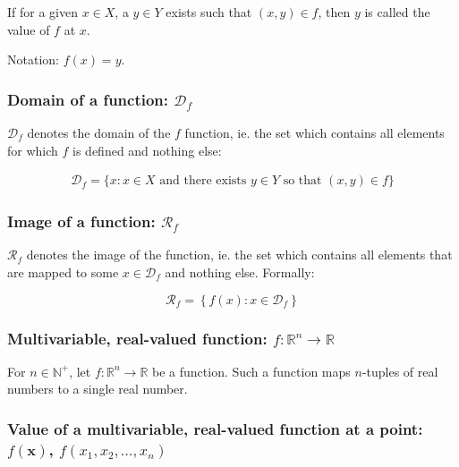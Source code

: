 \documentclass[titlepage]{article}
\begin{document}
          If for a given $x \in X$, a $y \in Y$ exists such that $(x, y) \in f$,
          then $y$ is called the value of $f$ at $x$.

          Notation: $f(x) = y$.

        \subsubsection{Domain of a function: $\mathcal{D}_f$}

          $\mathcal{D}_f$ denotes the domain of the $f$ function, ie. the set
          which contains all elements for which $f$ is defined and nothing else:

          \begin{align*}
            \mathcal{D}_f
              = \{
                  x
                  : x \in X \text{ and there exists } y \in Y
                    \text{ so that } (x, y) \in f
                \}
          \end{align*}

        \subsubsection{Image of a function: $\mathcal{R}_f$}

          $\mathcal{R}_f$ denotes the image of the function, ie. the set which
          contains all elements that are mapped to some $x \in \mathcal{D}_f$
          and nothing else. Formally:

          $$\mathcal{R}_f = \left\{ f(x) : x \in \mathcal{D}_f\right\}$$

        \subsubsection{%
          Multivariable, real-valued function:
          $f : \mathbb{R}^n \rightarrow \mathbb{R}$
        }

          For $n \in \mathbb{N}^+$, let $f : \mathbb{R}^n \rightarrow \mathbb{R}$
          be a function. Such a function maps $n$-tuples of real numbers to a
          single real number.

          \subsubsection{%
            Value of a multivariable, real-valued function at a point:
            $f(\mathbf{x})$, $f(x_1, x_2, \ldots, x_n)$
          }
\end{document}
